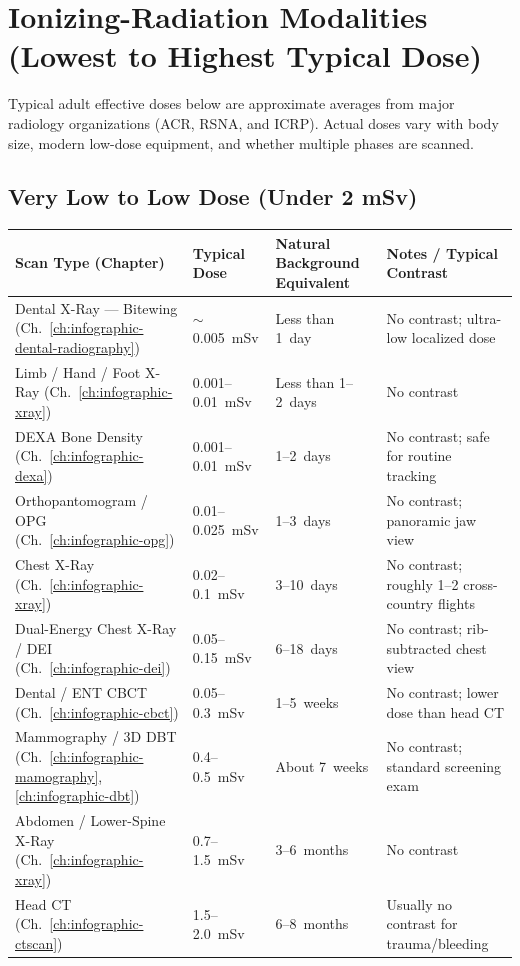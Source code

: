 \section{Ionizing-Radiation Modalities (Lowest to Highest Typical Dose)}
Typical adult effective doses below are approximate averages from major radiology organizations (ACR, RSNA, and ICRP). Actual doses vary with body size, modern low-dose equipment, and whether multiple phases are scanned.

\subsection{Very Low to Low Dose (Under 2 mSv)}
{\renewcommand{\arraystretch}{1.2}\noindent
\begin{tabularx}{\textwidth}{@{}p{} p{} p{} X@{}}
\toprule
\textbf{Scan Type (Chapter)} & \textbf{Typical Dose} & \textbf{Natural Background Equivalent} & \textbf{Notes / Typical Contrast} \\
\midrule
Dental X-Ray --- Bitewing (Ch.~\ref{ch:infographic-dental-radiography}) & $\sim$0.005~mSv & Less than 1~day & No contrast; ultra-low localized dose \\
Limb / Hand / Foot X-Ray (Ch.~\ref{ch:infographic-xray}) & 0.001--0.01~mSv & Less than 1--2~days & No contrast \\
DEXA Bone Density (Ch.~\ref{ch:infographic-dexa}) & 0.001--0.01~mSv & 1--2~days & No contrast; safe for routine tracking \\
Orthopantomogram / OPG (Ch.~\ref{ch:infographic-opg}) & 0.01--0.025~mSv & 1--3~days & No contrast; panoramic jaw view \\
Chest X-Ray (Ch.~\ref{ch:infographic-xray}) & 0.02--0.1~mSv & 3--10~days & No contrast; roughly 1--2 cross-country flights \\
Dual-Energy Chest X-Ray / DEI (Ch.~\ref{ch:infographic-dei}) & 0.05--0.15~mSv & 6--18~days & No contrast; rib-subtracted chest view \\
Dental / ENT CBCT (Ch.~\ref{ch:infographic-cbct}) & 0.05--0.3~mSv & 1--5~weeks & No contrast; lower dose than head CT \\
Mammography / 3D DBT (Ch.~\ref{ch:infographic-mamography}, \ref{ch:infographic-dbt}) & 0.4--0.5~mSv & About 7~weeks & No contrast; standard screening exam \\
Abdomen / Lower-Spine X-Ray (Ch.~\ref{ch:infographic-xray}) & 0.7--1.5~mSv & 3--6~months & No contrast \\
Head CT (Ch.~\ref{ch:infographic-ctscan}) & 1.5--2.0~mSv & 6--8~months & Usually no contrast for trauma/bleeding \\
\bottomrule
\end{tabularx}}

